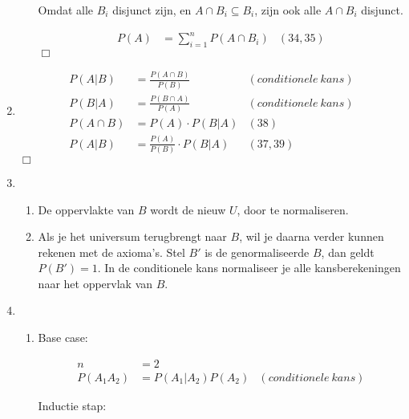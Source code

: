 \documentclass{article}
\begin{document}
\begin{enumerate}
\begin{enumerate}
                Omdat alle $B_i$ disjunct zijn, en $A \cap B_i \subseteq B_i$,
                zijn ook alle $A \cap B_i$ disjunct.

                \begin{align}
                    P(A) &= \sum_{i=1}^n P(A \cap B_i) & (34, 35)
                \end{align}
                $\Box$

        \end{enumerate}

    \item
        \begin{align}
            P(A|B) &= \frac{P(A \cap B)}{P(B)} & (conditionele\:kans)\\
            P(B|A) &= \frac{P(B \cap A)}{P(A)} & (conditionele\:kans)\\
            P(A \cap B) &= P(A) \cdot P(B|A) & (38)\\
            P(A|B) &= \frac{P(A)}{P(B)} \cdot P(B|A) & (37, 39)
        \end{align}
        $\Box$

    \item
        \begin{enumerate}
            \item
                De oppervlakte van $B$ wordt de nieuw $U$, door te normaliseren.

            \item
                Als je het universum terugbrengt naar $B$, wil je daarna verder
                kunnen rekenen met de axioma's. Stel $B'$ is de genormaliseerde
                $B$, dan geldt $P(B')=1$. In de conditionele kans normaliseer je
                alle kansberekeningen naar het oppervlak van $B$.

        \end{enumerate}

    \item
        \begin{enumerate}
            \item
                Base case:

                \begin{align}
                    n &= 2 &\\
                    P(A_1 A_2) &= P(A_1 | A_2) P(A_2) & (conditionele\:kans)
                \end{align}

                Inductie stap:


\end{enumerate}
\end{enumerate}
\end{document}
